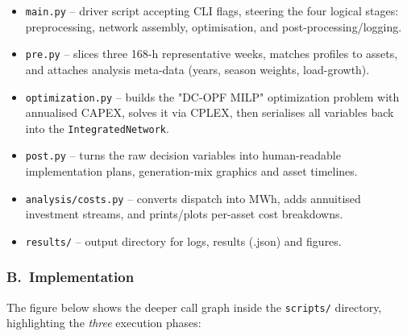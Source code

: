 \begin{itemize}
    \item \texttt{main.py} –\- driver script accepting CLI flags, steering the four logical stages:
          preprocessing, network assembly, optimisation, and post-processing/logging.  
    \item \texttt{pre.py} –\- slices three \mbox{168-h} representative weeks, matches
          profiles to assets, and attaches analysis meta-data (years, season weights, load-growth).
    \item \texttt{optimization.py} –\- builds the "DC-OPF MILP" optimization problem with annualised CAPEX,
          solves it via \textsc{CPLEX}, then serialises all variables back into the
          \texttt{IntegratedNetwork}.
    \item \texttt{post.py} –\- turns the raw decision variables into human-readable
          implementation plans, generation-mix graphics and asset timelines.
    \item \texttt{analysis/costs.py} –\- converts dispatch into MWh,
          adds annuitised investment streams, and prints/plots per-asset
          cost breakdowns.
    \item \texttt{results/} –\- output directory for logs, results (.json) and figures.
\end{itemize}

\subsubsection*{B.\ Implementation}
The figure below shows the deeper call graph inside the \texttt{scripts/} directory, highlighting the \emph{three}
execution phases:

